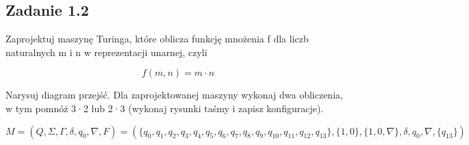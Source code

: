 \documentclass[leqno]{article}
\begin{document}
        \subsection{Zadanie 1.2}
            Zaprojektuj maszynę Turinga, które oblicza funkcję mnożenia f dla
            liczb naturalnych m i n w reprezentacji unarnej, czyli
        
            \begin{equation}
                f(m, n) = m \cdot n
            \end{equation}

            Narysuj diagram przejść. Dla zaprojektowanej maszyny wykonaj dwa 
            obliczenia, w tym pomnóż 3·2 lub 2·3 (wykonaj rysunki taśmy i zapisz konfiguracje).

            \begin{equation}
                M = (Q, \Sigma, \Gamma, \delta, q_0, \nabla, F) = (
                    \{q_0, q_1, q_2, q_3, q_4, q_5, q_6, q_7, q_8, q_9, q_{10}, q_{11}, q_{12}, q_{13}\}, 
                    \{1, 0\}, 
                    \{1, 0, \nabla\}, 
                    \delta, 
                    q_0, 
                    \nabla, 
                    \{q_{13}\}
                )
            \end{equation}
            
\end{document}
